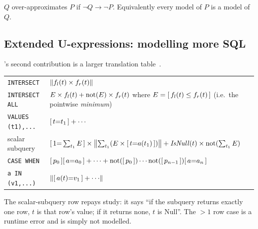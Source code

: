 \begin{definition}
$Q$ over-approximates $P$ if $\neg Q\to\neg P$. Equivalently every model of $P$ is a model
of $Q$.
\end{definition}


\subsection{Extended U-expressions: modelling more SQL}
\label{sec:ext-uexpr}

\sqlsolver{}'s second contribution is a larger translation table~\cite[Tab.\ 3--4]{sqlsolver}.

\begin{table}[h]\centering\small
\begin{tabularx}{\linewidth}{@{}lX@{}}
\toprule
\lstinline|INTERSECT| & $\left\lVert f_l(t)\times f_r(t) \right\rVert$\\
\lstinline|INTERSECT ALL| & $E\times f_l(t)+\mathrm{not}(E)\times f_r(t)$ where $E=[\,f_l(t)\le f_r(t)\,]$ \quad(i.e.\ the pointwise \emph{minimum})\\
\lstinline|VALUES (t1),...| & $[\,t{=}t_1\,]+\cdots$\\
scalar subquery & $[\,1{=}\sum_{t_1}E\,]\times\left\lVert \sum_{t_1}(E\times[\,t{=}a(t_1)\,]) \right\rVert+\mathit{IsNull}(t)\times\mathrm{not}(\sum_{t_1}E)$\\
\lstinline|CASE WHEN| & $[\,p_0\,][\,a{=}a_0\,]+\cdots+\mathrm{not}([\,p_0\,])\cdots\mathrm{not}([\,p_{n-1}\,])[\,a{=}a_n\,]$\\
\lstinline|a IN (v1,...)| & $\sq{\ind{a(t){=}v_1}+\cdots}$\\
\bottomrule
\end{tabularx}
\end{table}

The scalar-subquery row repays study: it says ``if the subquery returns exactly one row, $t$
is that row's value; if it returns none, $t$ is \textsf{Null}''. The $>1$ row case is a
runtime error and is simply not modelled.

